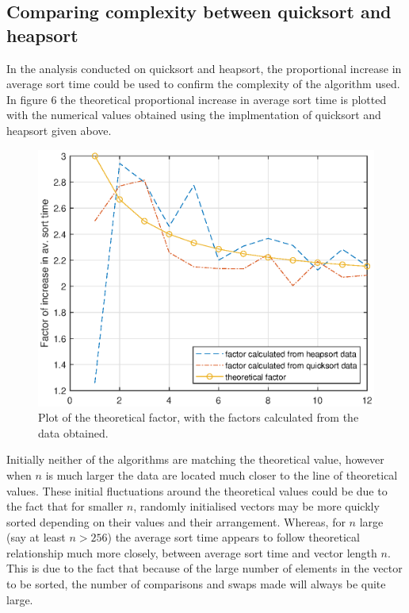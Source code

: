 \documentclass[a4paper, 12pt]{article}
\begin{document}
\subsection{Comparing complexity between quicksort and heapsort}
In the analysis conducted on quicksort and heapsort, the proportional increase in average sort time could be used to confirm the complexity of the algorithm used. In figure 6 the theoretical proportional increase in average sort time is plotted with the numerical values obtained using the implmentation of quicksort and heapsort given above.
\begin{figure}[H]
\centering
\includegraphics[scale=0.75]{quickandheap_factor}
\caption{Plot of the theoretical factor, with the factors calculated from the data obtained.}
\end{figure}
 Initially neither of the algorithms are matching the theoretical value, however when $n$ is much larger the data are located much closer to the line of theoretical values. These initial fluctuations around the theoretical values could be due to the fact that for smaller $n$, randomly initialised vectors may be more quickly sorted depending on their values and their arrangement. Whereas, for $n$ large (say at least $n>256$) the average sort time appears to follow theoretical relationship much more closely, between average sort time and vector length $n$. This is due to the fact that because of the large number of elements in the vector to be sorted, the number of comparisons and swaps made will always be quite large.     
\end{document}
